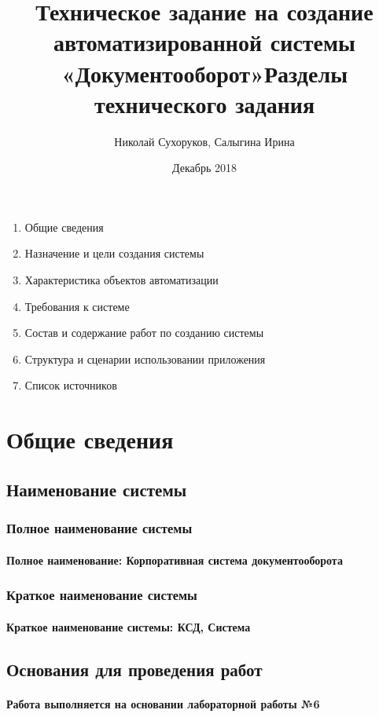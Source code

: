 \documentclass{article}
\title{Техническое задание на создание автоматизированной системы «Документооборот»}
\author{Николай Сухоруков, Салыгина Ирина }
\date{ Декабрь 2018}
\begin{document}
\maketitle

\title{Разделы технического задания}

\begin{enumerate}
    \item Общие сведения
    \item Назначение и цели создания системы
    \item Характеристика объектов автоматизации
    \item Требования к системе
    \item Состав и содержание работ по созданию системы
    \item Структура и сценарии использовании приложения
    \item Список источников
\end{enumerate}

\newpage

\section{Общие сведения}
    \subsection{Наименование системы}
        \subsubsection{Полное наименование системы}
            \paragraph{Полное наименование: Корпоративная система документооборота}
        \subsubsection{Краткое наименование системы}
            \paragraph{Краткое наименование системы: КСД, Система}
    
    \subsection{Основания для проведения работ}
        \paragraph{Работа выполняется на основании лабораторной работы №6}
    
\end{document}
